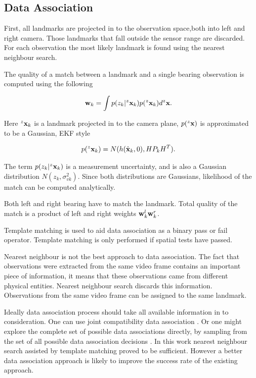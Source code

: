 \subsection{Data Association}

First, all landmarks are projected in to the observation space,both
into left and right camera. Those landmarks that fall outside the
sensor range are discarded. For each observation the most likely
landmark is found using the nearest neighbour search. 

The quality of a match between a landmark and a single bearing
observation is computed using the following

$$
  {\bf w}_k = \int p(z_k|^z{\bf x}_k)p(^z{\bf x}_k) d^z{\bf x}.
$$

Here $^z{\bf x}_k$ is a landmark projected in to the camera plane,
$p(^z{\bf x})$ is approximated to be a Gaussian, EKF style

$$
p(^z{\bf x}_k) = N(h(\hat{\bf x}_k,0), H P_k H^T).
$$

The term $p(z_k|^z{\bf x}_k)$ is a measurement uncertainty, and is
also a Gaussian distribution $N(z_k ,\sigma^2_{vk})$. Since both
distributions are Gaussians, likelihood of the match can be computed
analytically.

Both left and right bearing have to match the landmark. Total quality
of the match is a product of left and right weights ${\bf w}^l_k{\bf
w}^r _k$. 

Template matching is used to aid data association as a binary pass or
  fail operator. Template matching is only performed if spatial tests
  have passed.

Nearest neighbour is not the best approach to data association. The
fact that observations were extracted from the same video frame
contains an important piece of information, it means that these
observations came from different physical entities. Nearest neighbour
search discards this information. Observations from the same video
frame can be assigned to the same landmark.

Ideally data association process should take all available information
in to consideration. One can use joint compatibility data association
\cite{neira01:_data_assoc_stoch_mappin_using}. Or one might explore
the complete set of possible data associations directly, by sampling
from the set of all possible data association decisions
\cite{nieto2003}. In this work nearest neighbour search
assisted by template matching proved to be sufficient. However a
better data association approach is likely to improve the success rate
of the existing approach.


